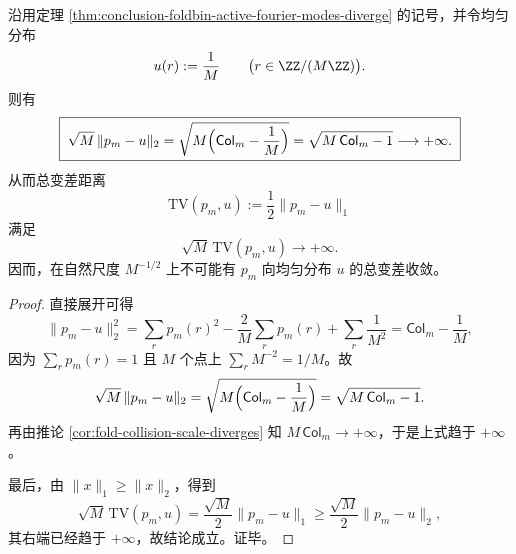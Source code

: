\begin{corollary}\label{cor:conclusion-foldbin-natural-scale-tv-impossible}
沿用定理 \ref{thm:conclusion-foldbin-active-fourier-modes-diverge} 的记号，并令均匀分布
\[
u(r):=\frac1M
\qquad
\bigl(r\in \ZZ/(M\ZZ)\bigr).
\]
则有
\[
\boxed{\;
\sqrt{M}\,\|p_m-u\|_2
=
\sqrt{M\Bigl(\mathsf{Col}_m-\frac1M\Bigr)}
=
\sqrt{M\,\mathsf{Col}_m-1}
\longrightarrow +\infty.\;}
\]
从而总变差距离
\[
\mathrm{TV}(p_m,u):=\frac12\|p_m-u\|_1
\]
满足
\[
\boxed{\;
\sqrt{M}\,\mathrm{TV}(p_m,u)\longrightarrow +\infty.\;}
\]
因而，在自然尺度 \(M^{-1/2}\) 上不可能有 \(p_m\) 向均匀分布 \(u\) 的总变差收敛。
\end{corollary}
\begin{proof}
直接展开可得
\[
\|p_m-u\|_2^2
=
\sum_r p_m(r)^2-\frac{2}{M}\sum_r p_m(r)+\sum_r\frac1{M^2}
=
\mathsf{Col}_m-\frac1M,
\]
因为 \(\sum_r p_m(r)=1\) 且 \(M\) 个点上 \(\sum_r M^{-2}=1/M\)。故
\[
\sqrt{M}\,\|p_m-u\|_2
=
\sqrt{M\Bigl(\mathsf{Col}_m-\frac1M\Bigr)}
=
\sqrt{M\,\mathsf{Col}_m-1}.
\]
再由推论 \ref{cor:fold-collision-scale-diverges} 知 \(M\,\mathsf{Col}_m\to+\infty\)，于是上式趋于 \(+\infty\)。

最后，由 \(\|x\|_1\ge \|x\|_2\)，得到
\[
\sqrt{M}\,\mathrm{TV}(p_m,u)
=
\frac{\sqrt{M}}{2}\|p_m-u\|_1
\ge
\frac{\sqrt{M}}{2}\|p_m-u\|_2,
\]
其右端已经趋于 \(+\infty\)，故结论成立。证毕。
\end{proof}

